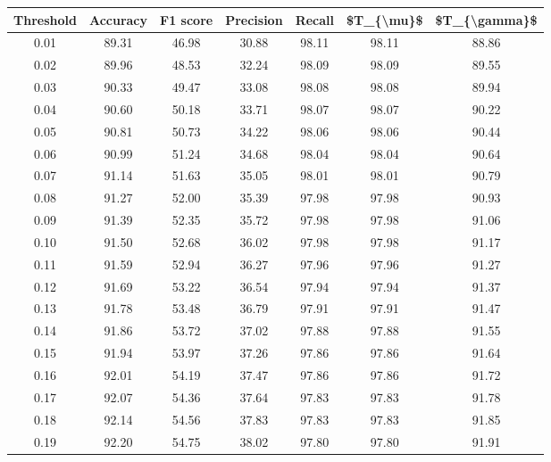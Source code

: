 \begin{tabular}{|c|c|c|c|c|c|c|}
\hline
 Threshold &  Accuracy &  F1 score &  Precision &  Recall &  \$T\_\{\textbackslash mu\}\$ &  \$T\_\{\textbackslash gamma\}\$ \\
\hline
      0.01 &     89.31 &     46.98 &      30.88 &   98.11 &      98.11 &         88.86 \\
      0.02 &     89.96 &     48.53 &      32.24 &   98.09 &      98.09 &         89.55 \\
      0.03 &     90.33 &     49.47 &      33.08 &   98.08 &      98.08 &         89.94 \\
      0.04 &     90.60 &     50.18 &      33.71 &   98.07 &      98.07 &         90.22 \\
      0.05 &     90.81 &     50.73 &      34.22 &   98.06 &      98.06 &         90.44 \\
      0.06 &     90.99 &     51.24 &      34.68 &   98.04 &      98.04 &         90.64 \\
      0.07 &     91.14 &     51.63 &      35.05 &   98.01 &      98.01 &         90.79 \\
      0.08 &     91.27 &     52.00 &      35.39 &   97.98 &      97.98 &         90.93 \\
      0.09 &     91.39 &     52.35 &      35.72 &   97.98 &      97.98 &         91.06 \\
      0.10 &     91.50 &     52.68 &      36.02 &   97.98 &      97.98 &         91.17 \\
      0.11 &     91.59 &     52.94 &      36.27 &   97.96 &      97.96 &         91.27 \\
      0.12 &     91.69 &     53.22 &      36.54 &   97.94 &      97.94 &         91.37 \\
      0.13 &     91.78 &     53.48 &      36.79 &   97.91 &      97.91 &         91.47 \\
      0.14 &     91.86 &     53.72 &      37.02 &   97.88 &      97.88 &         91.55 \\
      0.15 &     91.94 &     53.97 &      37.26 &   97.86 &      97.86 &         91.64 \\
      0.16 &     92.01 &     54.19 &      37.47 &   97.86 &      97.86 &         91.72 \\
      0.17 &     92.07 &     54.36 &      37.64 &   97.83 &      97.83 &         91.78 \\
      0.18 &     92.14 &     54.56 &      37.83 &   97.83 &      97.83 &         91.85 \\
      0.19 &     92.20 &     54.75 &      38.02 &   97.80 &      97.80 &         91.91 \\

\end{tabular}
